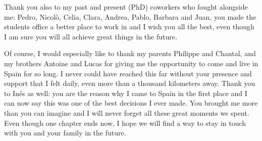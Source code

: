 \documentclass[a4paper, 10pt, openright]{report}
\begin{document}
Thank you also to my past and present (PhD) coworkers who fought alongside me: Pedro, Nicol\`{o}, Celia, Clara, Andrea, Pablo, Barbara and Juan, you made the students office a better place to work in and I wish you all the best, even though I am sure you will all achieve great things in the future.

Of course, I would especially like to thank my parents Philippe and Chantal, and my brothers Antoine and Lucas for giving me the opportunity to come and live in Spain for so long. I never could have reached this far without your presence and support that I felt daily, even more than a thousand kilometers away. Thank you to In\'{e}s as well: you are the reason why I came to Spain in the first place and I can now say this was one of the best decisions I ever made. You brought me more than you can imagine and I will never forget all these great moments we spent. Even though one chapter ends now, I hope we will find a way to stay in touch with you and your family in the future.

\newpage

%
\end{document}
